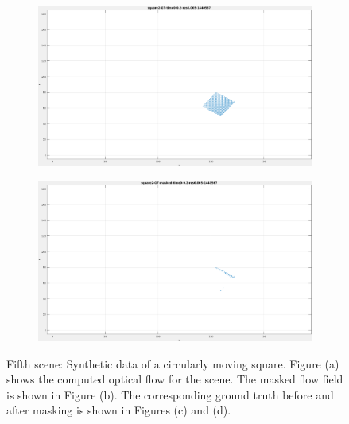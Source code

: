 \begin{figure}[tb]
\begin{subfigure}{.45\textwidth}
  \caption{}
\end{subfigure}
\begin{subfigure}{.45\textwidth}
  \centering
  \includegraphics[height=.6\linewidth]{figs/square2/square2-GT-1.png}
  \caption{}
\end{subfigure}
\begin{subfigure}{.45\textwidth}
  \centering
  \includegraphics[height=.6\linewidth]{figs/square2/square2-GT-masked-1.png}
  \caption{}
\end{subfigure}
\caption[Fifth scene: Synthetic data of a circularly moving square.]{Fifth scene: Synthetic data of a circularly moving square.
Figure (a) shows the computed optical flow for the scene. 
The masked flow field is shown in Figure (b).
The corresponding ground truth before and after masking is shown in Figures (c) and (d).}
\label{fig:square2-snapshots}
\end{figure}


